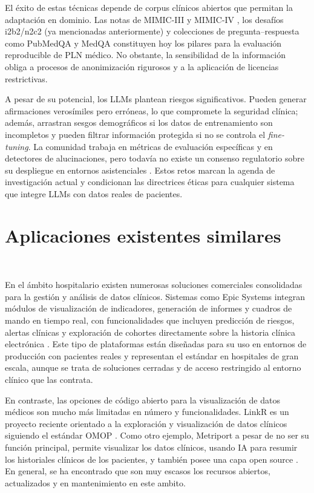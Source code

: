 El éxito de estas técnicas depende de corpus clínicos abiertos que permitan la adaptación en dominio. Las notas de MIMIC-III y MIMIC-IV \cite{Johnson2023_MIMICIVNote}, los desafíos i2b2/n2c2 \cite{n2c2} (ya mencionadas anteriormente) y colecciones de pregunta–respuesta como PubMedQA \cite{Jin2019_PubMedQA} y MedQA \cite{Jin2020_MedQA} constituyen hoy los pilares para la evaluación reproducible de PLN médico. No obstante, la sensibilidad de la información obliga a procesos de anonimización rigurosos y a la aplicación de licencias restrictivas.

A pesar de su potencial, los LLMs plantean riesgos significativos. Pueden generar afirmaciones verosímiles pero erróneas, lo que compromete la seguridad clínica; además, arrastran sesgos demográficos si los datos de entrenamiento son incompletos y pueden filtrar información protegida si no se controla el \textit{fine-tuning}. La comunidad trabaja en métricas de evaluación específicas y en detectores de alucinaciones, pero todavía no existe un consenso regulatorio sobre su despliegue en entornos asistenciales \cite{Bommasani2022_FoundationModels}. Estos retos marcan la agenda de investigación actual y condicionan las directrices éticas para cualquier sistema que integre LLMs con datos reales de pacientes.



\section{Aplicaciones existentes similares}\

En el ámbito hospitalario existen numerosas soluciones comerciales consolidadas para la gestión y análisis de datos clínicos. Sistemas como Epic Systems integran módulos de visualización de indicadores, generación de informes y cuadros de mando en tiempo real, con funcionalidades que incluyen predicción de riesgos, alertas clínicas y exploración de cohortes directamente sobre la historia clínica electrónica \cite{Epic}. Este tipo de plataformas están diseñadas para su uso en entornos de producción con pacientes reales y representan el estándar en hospitales de gran escala, aunque se trata de soluciones cerradas y de acceso restringido al entorno clínico que las contrata.

En contraste, las opciones de código abierto para la visualización de datos médicos son mucho más limitadas en número y funcionalidades. LinkR es un proyecto reciente orientado a la exploración y visualización de datos clínicos siguiendo el estándar OMOP \cite{linkR}. Como otro ejemplo, Metriport a pesar de no ser su función principal, permite visualizar los datos clínicos, usando IA para resumir los historiales clínicos de los pacientes, y también posee una capa open source \cite{metriport}. En general, se ha encontrado que son muy escasos los recursos abiertos, actualizados y en mantenimiento en este ambito.


